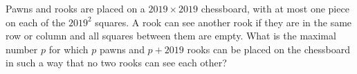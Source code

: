 Pawns and rooks are placed on a $2019\times 2019$ chessboard, with at most one piece on each of the $2019^2$ squares. A rook can see another rook if they are in the same row or column and all squares between them are empty. What is the maximal number $p$ for which $p$ pawns and $p+2019$ rooks can be placed on the chessboard in such a way that no two rooks can see each other?